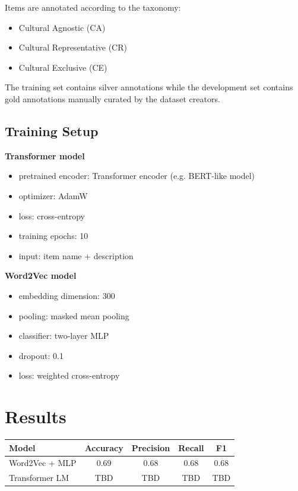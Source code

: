 \documentclass[11pt]{article}
\begin{document}
Items are annotated according to the taxonomy:
\begin{itemize}
\item Cultural Agnostic (CA)
\item Cultural Representative (CR)
\item Cultural Exclusive (CE)
\end{itemize}

The training set contains silver annotations while the development set contains gold annotations manually curated by the dataset creators.

\subsection{Training Setup}

\textbf{Transformer model}

\begin{itemize}
\item pretrained encoder: Transformer encoder (e.g. BERT-like model)
\item optimizer: AdamW
\item loss: cross-entropy
\item training epochs: 10
\item input: item name + description
\end{itemize}

\textbf{Word2Vec model}

\begin{itemize}
\item embedding dimension: 300
\item pooling: masked mean pooling
\item classifier: two-layer MLP
\item dropout: 0.1
\item loss: weighted cross-entropy
\end{itemize}

\section{Results}

\begin{center}
\begin{tabular}{lcccc}
\toprule
Model & Accuracy & Precision & Recall & F1 \\
\midrule
Word2Vec + MLP & 0.69 & 0.68 & 0.68 & 0.68 \\
Transformer LM & TBD & TBD & TBD & TBD \\
\bottomrule
\end{tabular}
\end{center}
\end{document}
